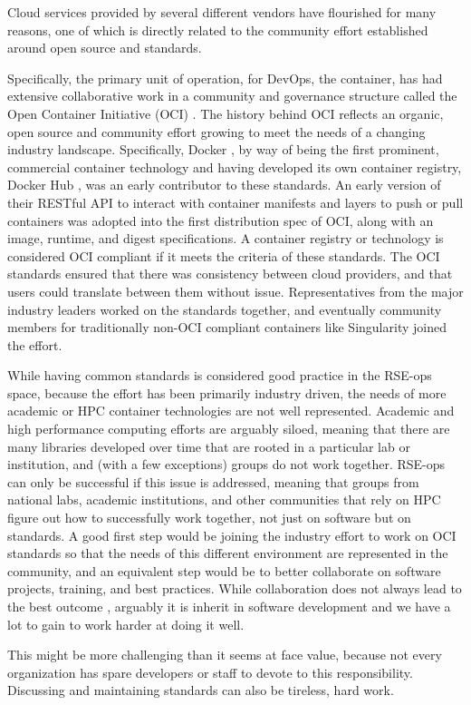 Cloud services provided by several different vendors have flourished for many reasons, one of which is directly related to the community effort established around open source and standards.

Specifically, the primary unit of operation, for DevOps, the container, has had extensive collaborative work in a community and governance structure called the Open Container Initiative (OCI) \cite{oci}. The history behind
OCI reflects an organic, open source and community effort growing to meet the needs of a changing industry landscape. Specifically, Docker \cite{docker}, by way of being the first prominent,
commercial container technology and having developed its own container registry, Docker Hub \cite{docker-hub}, was an early contributor to these standards. An early version of their RESTful API to interact with container manifests and layers to push or pull containers was adopted into the first distribution spec of OCI, along with an image, runtime, and digest specifications. A container registry or technology is considered OCI compliant if it meets the criteria of these standards. The OCI standards ensured that there was consistency between cloud providers, and that users could translate between them without issue. Representatives from the major industry leaders worked on the standards together, and eventually community members for traditionally non-OCI compliant containers like Singularity joined the effort. 

While having common standards is considered good practice in the RSE-ops space, because the effort has been primarily industry driven, the needs of more academic or HPC container technologies are not well represented. Academic and high performance computing efforts are arguably siloed, meaning that there are many libraries developed over time that are rooted in a particular lab or institution, and (with a few exceptions) groups do not work together. RSE-ops can only be successful if this issue is addressed, meaning that groups from national labs, academic institutions, and other communities
that rely on HPC figure out how to successfully work together, not just on software but on standards. A good first step would be joining the industry effort to work on OCI standards so that the needs of this different environment are represented in the community, and an equivalent step would be to better collaborate on software projects, training, and best practices. While collaboration does not always lead to the best outcome \cite{Wikipedia_contributors2021-wi}, arguably it is inherit in software development \cite{Whitehead2010-zg} and we have a lot to gain to work harder at doing it well.

This might be more challenging than it seems at face value, because not every organization has spare developers or staff to devote to this responsibility. Discussing and maintaining standards can also be tireless, hard work.
